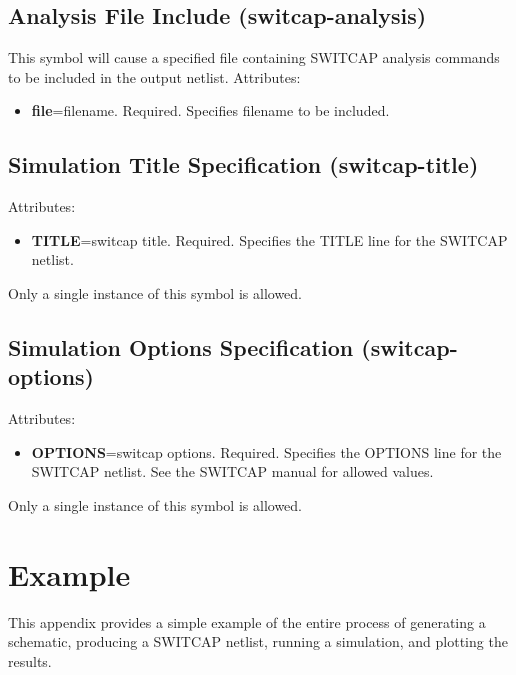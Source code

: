 \documentclass{article}
\begin{document}
\subsection{Analysis File Include (switcap-analysis)}
This symbol will cause a specified file containing SWITCAP analysis
commands to be included in the output netlist.
Attributes:
\begin{itemize}
\item {\bf file}=filename.  Required.  Specifies filename to be
  included.
\end{itemize}

\subsection{Simulation Title Specification (switcap-title)}
Attributes:
\begin{itemize}
\item {\bf TITLE}=switcap title.  Required.  Specifies the TITLE
  line for the SWITCAP netlist.
\end{itemize}
Only a single instance of this symbol is allowed.

\subsection{Simulation Options Specification (switcap-options)}
Attributes:
\begin{itemize}
\item {\bf OPTIONS}=switcap options.  Required.  Specifies the OPTIONS
  line for the SWITCAP netlist.  See the SWITCAP manual for allowed
  values. 
\end{itemize}
Only a single instance of this symbol is allowed.


\section{Example}
This appendix provides a simple example of the entire process of
generating a schematic, producing a SWITCAP netlist, running a
simulation, and plotting the results. 
\end{document}
